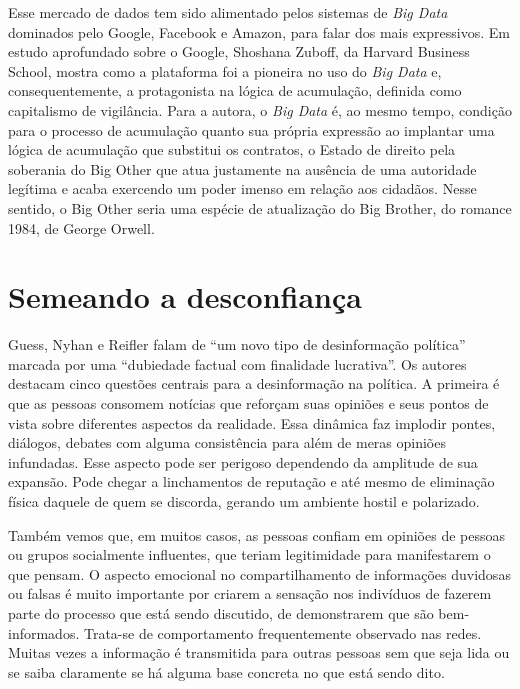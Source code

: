 Esse mercado de dados tem sido alimentado pelos sistemas de \textit{Big Data}
dominados pelo Google, Facebook e Amazon, para falar dos mais
expressivos. Em estudo aprofundado sobre o Google, Shoshana Zuboff, da
Harvard Business School, mostra como a plataforma foi a pioneira
no uso do \textit{Big Data} e, consequentemente, a protagonista na lógica de
acumulação, definida como capitalismo de vigilância. Para a autora, o
\textit{Big Data} é, ao mesmo tempo, condição para o processo de
acumulação quanto sua própria expressão ao implantar uma lógica de
acumulação que substitui os contratos, o Estado de direito pela
soberania do Big Other que atua justamente na ausência de uma autoridade
legítima e acaba exercendo um poder imenso em relação aos cidadãos.
Nesse sentido, o Big Other seria uma espécie de atualização do Big
Brother, do romance 1984, de George Orwell.

\section{Semeando a desconfiança}

Guess, Nyhan e Reifler falam de ``um novo tipo de desinformação
política'' marcada por uma ``dubiedade factual com finalidade
lucrativa''. Os autores destacam cinco questões centrais para a
desinformação na política. A primeira é que as pessoas consomem notícias
que reforçam suas opiniões e seus pontos de vista sobre diferentes
aspectos da realidade. Essa dinâmica faz implodir pontes, diálogos,
debates com alguma consistência para além de meras opiniões infundadas.
Esse aspecto pode ser perigoso dependendo da amplitude de sua expansão.
Pode chegar a linchamentos de reputação e até mesmo de eliminação física
daquele de quem se discorda, gerando um ambiente hostil e polarizado.

Também vemos que, em muitos casos, as pessoas confiam em opiniões de
pessoas ou grupos socialmente influentes, que teriam legitimidade para
manifestarem o que pensam. O aspecto
emocional no compartilhamento de informações duvidosas ou falsas é muito
importante por criarem a sensação nos indivíduos de fazerem parte do
processo que está sendo discutido, de demonstrarem que são
bem-informados. Trata-se de comportamento frequentemente observado nas
redes. Muitas vezes a informação é transmitida para outras pessoas sem
que seja lida ou se saiba claramente se há alguma base concreta no que
está sendo dito.

